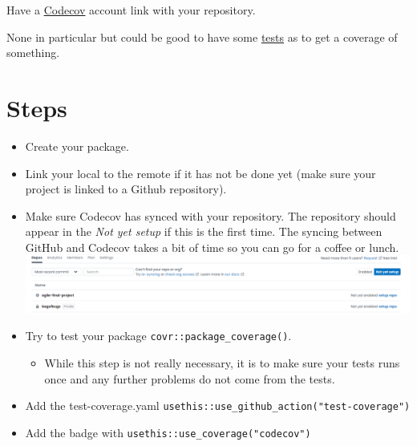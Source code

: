 \documentclass[
]{book}
\providecommand{\tightlist}{%
  \setlength{\itemsep}{0pt}\setlength{\parskip}{0pt}}
\begin{document}
Have a \href{https://app.codecov.io/}{Codecov} account link with your repository.

None in particular but could be good to have some \href{https://r-pkgs.org/testing-basics.html}{tests} as to get a coverage of something.

\hypertarget{steps-1}{%
\section{Steps}\label{steps-1}}

\begin{itemize}
\item
  Create your package.
\item
  Link your local to the remote if it has not be done yet (make sure your project is linked to a Github repository).
\item
  Make sure Codecov has synced with your repository. The repository should appear in the \emph{Not yet setup} if this is the first time. The syncing between GitHub and Codecov takes a bit of time so you can go for a coffee or lunch.\includegraphics{images/test-coverage/codecovnotyetsetup.png}
\item
  Try to test your package \texttt{covr::package\_coverage()}.

  \begin{itemize}
  \tightlist
  \item
    While this step is not really necessary, it is to make sure your tests runs once and any further problems do not come from the tests.
  \end{itemize}
\item
  Add the test-coverage.yaml \texttt{usethis::use\_github\_action("test-coverage")}
\item
  Add the badge with \texttt{usethis::use\_coverage("codecov")}


\end{itemize}
\end{document}
